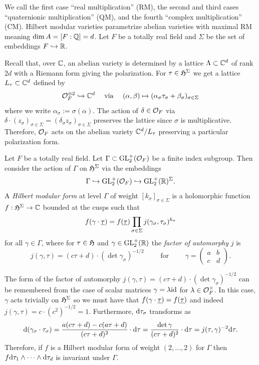 \documentclass[main.tex]{subfiles}
\begin{document}
We call the first case ``real multiplication'' (RM), the second and third cases ``quaternionic multiplication'' (QM), and the fourth ``complex multiplication'' (CM). Hilbert modular varieties parametrize abelian varieties with maximal RM meaning $\dim{A} = [F : \mathbb{Q}] = d$. Let $F$ be a totally real field and $\Sigma$ be the set of embeddings $F \hookrightarrow \mathbb{R}$.
\par 
Recall that, over $\mathbb{C}$, an abelian variety is determined by a lattice $\Lambda \subset \mathbb{C}^d$ of rank $2d$ with a Riemann form giving the polarization. For $\tau \in \mathfrak{H}^{\Sigma}$ we get a lattice $L_{\tau} \subset \mathbb{C}^d$ defined by 
\[ \mathcal{O}_F^{\oplus 2} \hookrightarrow \mathbb{C}^d \quad \text{ via } \quad (\alpha, \beta) \mapsto (\alpha_{\sigma} \tau_{\sigma} + \beta_{\sigma})_{\sigma \in \Sigma} \]
where we write $\alpha_{\sigma} := \sigma(\alpha)$. The action of $\delta \in \mathcal{O}_F$ via $\delta \cdot (z_{\sigma})_{\sigma \in \Sigma} = (\delta_{\sigma} z_{\sigma})_{\sigma \in \Sigma}$ preserves the lattice since $\sigma$ is multiplicative. Therefore, $\mathcal{O}_F$ acts on the abelian variety $\mathbb{C}^d / L_{\tau}$ preserving a particular polarization form.


\begin{defn}
Let $F$ be a totally real field. Let $\Gamma \subset \mathrm{GL}_2^+(\mathcal{O}_F)$ be a finite index subgroup. Then consider the action of $\Gamma$ on $\mathfrak{H}^{\Sigma}$ via the embeddings 
\[ \Gamma \hookrightarrow \mathrm{GL}_2^+(\mathcal{O}_F) \hookrightarrow \mathrm{GL}^+_2(\mathbb{R})^{\Sigma}. \]
A \textit{Hilbert modular form} at level $\Gamma$ of weight $[k_\sigma]_{\sigma \in \Sigma}$ is a holomorphic function $f : \mathfrak{H}^{\Sigma} \to \mathbb{C}$ bounded at the cusps such that
\[ f(\gamma \cdot \underline{\tau}) = f(\underline{\tau}) \prod_{\sigma \in \Sigma} j(\gamma_{\sigma}, \tau_{\sigma})^{k_{\sigma}}  \]
for all $\gamma \in \Gamma$,
where for $\tau \in \mathfrak{H}$ and $\gamma \in \mathrm{GL}_2^+(\mathbb{R})$ 
the \textit{factor of automorphy} $j$ is
\[ j(\gamma, \tau) = (c \tau + d) \cdot (\det{\gamma_{\sigma}})^{-1/2} \quad \quad \text{ for } \quad \quad \gamma = \begin{pmatrix}
a & b 
\\
c & d 
\end{pmatrix}. \]
\end{defn}

\begin{rmk}
The form of the factor of automorphy $j(\gamma, \tau) = (c \tau + d) \cdot (\det{\gamma_{\sigma}})^{-1/2}$ can be remembered from the case of scalar matrices $\gamma = \lambda \mathrm{id}$ for $\lambda \in \mathcal{O}_F^{\times}$. In this case, $\gamma$ acts trivially on $\mathfrak{H}^{\Sigma}$ so we must have that $f(\gamma \cdot \underline{\tau}) = f(\underline{\tau})$ and indeed $j(\gamma, \tau) = c \cdot (c^2)^{-1/2} = 1$. Furthermore, $\mathrm{d}{\tau_{\sigma}}$ transforms as
\[ \mathrm{d}(\gamma_{\sigma} \cdot \tau_{\sigma}) = \frac{a (c \tau + d) - c(a \tau + d)}{(c \tau + d)^2} \cdot \mathrm{d}{\tau} = \frac{\det{\gamma}}{(c \tau + d)^2} \cdot \mathrm{d}{\tau} = j(\tau, \gamma)^{-2} \mathrm{d}{\tau}. \]
Therefore, if $f$ is a Hilbert modular form of weight $(2, \dots, 2)$ for $\Gamma$ then $f \mathrm{d}{\tau_1} \wedge \cdots \wedge \mathrm{d}{\tau_d}$ is invariant under $\Gamma$. 
\end{rmk}
\end{document}
